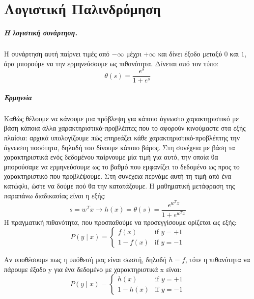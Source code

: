 \chapter{Λογιστική Παλινδρόμηση}
\label{appendix:LReg}
\paragraph{Η λογιστική συνάρτηση.} Η συνάρτηση αυτή παίρνει τιμές από $- \infty$ μέχρι $+ \infty$ και δίνει έξοδο μεταξύ $0$ και $1$, άρα μπορούμε να την ερμηνεύσουμε ως πιθανότητα. Δίνεται από τον τύπο:
\begin{equation}
\theta(s)=\frac{e^s}{1 + e^s}
\end{equation}


\paragraph{Ερμηνεία} Καθώς θέλουμε να κάνουμε μια πρόβλεψη για κάποιο άγνωστο χαρακτηριστικό με βάση κάποια άλλα χαρακτηριστικά-προβλέπτες που το αφορούν κινούμαστε στα εξής πλαίσια: αρχικά υπολογίζουμε πώς επηρεάζει κάθε χαρακτηριστικό-προβλέπτης την άγνωστη ποσότητα, δηλαδή του δίνουμε κάποιο βάρος. Στη συνέχεια με βάση τα χαρακτηριστικά ενός δεδομένου παίρνουμε μία τιμή
για αυτό, την οποία θα μπορούσαμε να ερμηνεύσουμε ως το βαθμό που εμφανίζει το δεδομένο ως προς το χαρακτηριστικό που προβλέψουμε. Στη συνέχεια περνάμε αυτή τη τιμή  από ένα κατώφλι, ώστε να δούμε πού θα την κατατάξουμε. Η μαθηματική μετάφραση της παραπάνω διαδικασίας είναι η εξής:
\begin{equation}
s=w^T x \rightarrow h(x)=\theta(s)=\frac{e^{w^T x}}{1 + e^{w^T x} }\end{equation}
Η πραγματική πιθανότητα, που προσπαθούμε να προσεγγίσουμε  ορίζεται ως εξής:
\begin{equation}
P(y \mid x)=\left\{
\begin{array}{ll}
f(x)  & \mbox{if } y = +1 \\
1 - f(x)  & \mbox{if } y = -1
\end{array}
\right.
\end{equation}

Αν υποθέσουμε πως η υπόθεσή μας είναι σωστή, δηλαδή $h=f$, τότε η πιθανότητα να πάρουμε έξοδο y για ένα δεδομένο με χαρακτηριστικά x είναι:
\begin{equation}
P(y \mid x)=\left\{
\begin{array}{ll}
h(x)  & \mbox{if } y = +1 \\
1 - h(x)  & \mbox{if } y = -1
\end{array}
\right.
\end{equation}

